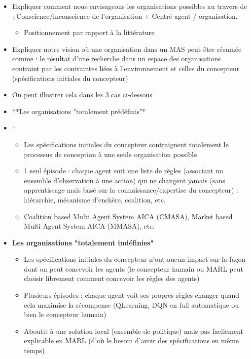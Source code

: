 \documentclass[runningheads]{llncs}
\begin{document}
\begin{itemize}

    \item Expliquer comment nous envisageons les organisations possibles au travers de : Conscience/inconscience de l’organisation + Centré agent / organisation.
          \begin{itemize}
              \item Positionnement par rapport à la littérature
          \end{itemize}
    \item Expliquer notre vision où une organisation dans un MAS peut être résumée comme : le résultat d'une recherche dans un espace des organisations contraint par les contraintes liées à l'environnement et celles du concepteur (spécifications initiales du concepteur)
    \item On peut illustrer cela dans les 3 cas ci-dessous
    \item **Les organisations "totalement prédéfinis"*\item :
          \begin{itemize}
              \item Les spécifications initiales du concepteur contraignent totalement le processus de conception à une seule organisation possible
              \item 1 seul épisode : chaque agent suit une liste de règles (associant un ensemble d’observation à une action) qui ne changent jamais (sans apprentissage mais basé sur la connaissance/expertise du concepteur) : hiérarchie, mécanisme d’enchère, coalition, etc.
              \item Coalition based Multi Agent System AICA (CMASA), Market based Multi Agent System AICA (MMASA), etc.
          \end{itemize}
    \item \textbf{Les organisations "totalement indéfinies"}
          \begin{itemize}
              \item Les spécifications initiales du concepteur n'ont aucun impact sur la façon dont on peut concevoir les agents (le concepteur humain ou MARL peut choisir librement comment concevoir les règles des agents)
              \item Plusieurs épisodes : chaque agent voit ses propres règles changer quand cela maximise la récompense (QLearning, DQN en full automatique ou bien le concepteur humain)
              \item Aboutit à une solution local (ensemble de politique) mais pas facilement explicable en MARL (d'où le besoin d'avoir des spécifications en même temps)

\end{itemize}
\end{itemize}
\end{document}
